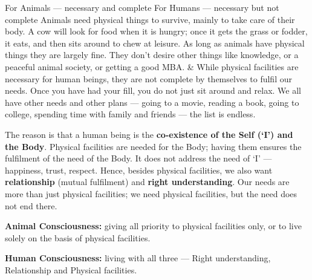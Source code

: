 \ans
\begin{cmptable}{For Animals --- necessary and complete}%
                {For Humans --- necessary but not complete}
Animals need physical things to survive, mainly to take care of their body. A
  cow will look for food when it is hungry; once it gets the grass or fodder,
  it eats, and then sits around to chew at leisure. As long as animals have
  physical things they are largely fine. They don't desire other things like
  knowledge, or a peaceful animal society, or getting a good MBA. &
While physical facilities are necessary for human beings, they are not
  complete by themselves to fulfil our needs. Once you have had your fill, you
  do not just sit around and relax. We all have other needs and other plans
  --- going to a movie, reading a book, going to college, spending time with
  family and friends --- the list is endless. \\ \hline
\end{cmptable}

The reason is that a human being is the \textbf{co-existence of the Self (`I')
and the Body}. Physical facilities are needed for the Body; having them
ensures the fulfilment of the need of the Body. It does not address the need
of `I' --- happiness, trust, respect. Hence, besides physical facilities, we
also want \textbf{relationship} (mutual fulfilment) and \textbf{right
understanding}. Our needs are more than just physical facilities; we need
physical facilities, but the need does not end there.


\ans
\begin{abul}
\item \textbf{Animal Consciousness:} giving all priority to physical
      facilities only, or to live solely on the basis of physical facilities.
\item \textbf{Human Consciousness:} living with all three --- Right
      understanding, Relationship and Physical facilities.
\end{abul}


